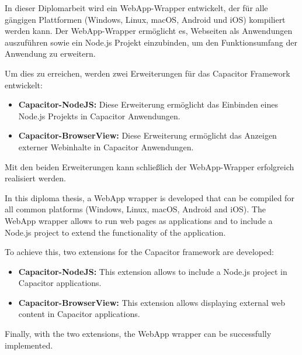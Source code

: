 
In dieser Diplomarbeit wird ein WebApp-Wrapper entwickelt, der für alle gängigen Plattformen (Windows, Linux, macOS, Android und iOS) kompiliert werden kann.
Der WebApp-Wrapper ermöglicht es, Webseiten als Anwendungen auszuführen sowie ein Node.js Projekt einzubinden, um den Funktionsumfang der Anwendung zu erweitern.

Um dies zu erreichen, werden zwei Erweiterungen für das Capacitor Framework entwickelt:

\begin{itemize}
  \item \textbf{Capacitor-NodeJS:} Diese Erweiterung ermöglicht das Einbinden eines Node.js Projekts in Capacitor Anwendungen.
  \item \textbf{Capacitor-BrowserView:} Diese Erweiterung ermöglicht das Anzeigen externer Webinhalte in Capacitor Anwendungen.
\end{itemize}

Mit den beiden Erweiterungen kann schließlich der WebApp-Wrapper erfolgreich realisiert werden.


In this diploma thesis, a WebApp wrapper is developed that can be compiled for all common platforms (Windows, Linux, macOS, Android and iOS).
The WebApp wrapper allows to run web pages as applications and to include a Node.js project to extend the functionality of the application.

To achieve this, two extensions for the Capacitor framework are developed:

\begin{itemize}
  \item \textbf{Capacitor-NodeJS:} This extension allows to include a Node.js project in Capacitor applications.
  \item \textbf{Capacitor-BrowserView:} This extension allows displaying external web content in Capacitor applications.
\end{itemize}

Finally, with the two extensions, the WebApp wrapper can be successfully implemented.
